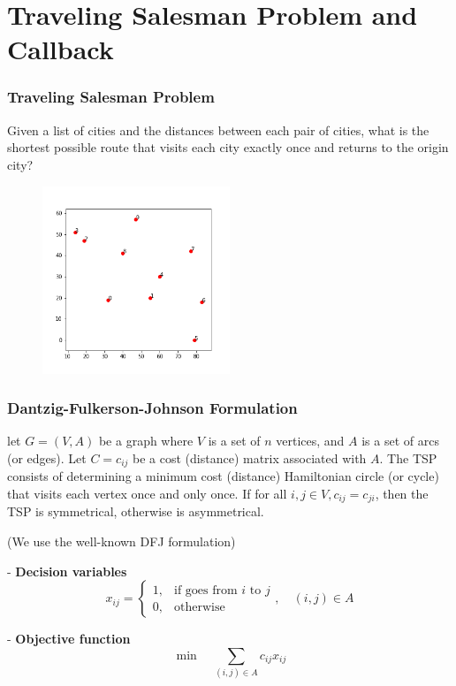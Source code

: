 \documentclass[10pt]{beamer}
\begin{document}
	\section{Traveling Salesman Problem and Callback}
		\begin{frame}
			\frametitle{Traveling Salesman Problem}
			Given a list of cities and the distances between each pair of cities, what is the shortest possible route that visits each city exactly once and returns to the origin city?
			\begin{figure}[!h]
				\centering
				\includegraphics[width=0.5\textwidth]{TSP}
			\end{figure}
		\end{frame}

		\begin{frame}
			\frametitle{Dantzig-Fulkerson-Johnson Formulation}
			let $G = (V, A)$ be a graph where $V$ is a set of $n$ vertices, and $A$ is a set of arcs (or edges). Let $C = c_{ij}$ be a cost (distance) matrix associated with $A$. The TSP consists of determining a minimum cost (distance) Hamiltonian circle (or cycle) that visits each vertex once and only once. If for all $i, j \in V, c_{ij} = c_{ji}$, then the TSP is symmetrical, otherwise is asymmetrical.

			(We use the well-known DFJ formulation)

			- \textbf{Decision variables}
			\begin{equation}
				x_{ij} = \begin{cases}
							1, &\text{if goes from } i \text{ to } j\\ 
							0, & \text{otherwise}
						\end{cases}, \quad (i, j) \in A
			\end{equation}

			- \textbf{Objective function}
				\begin{equation}
					\min \quad \sum_{(i, j)\in A} c_{ij}x_{ij}
				\end{equation}
		\end{frame}
\end{document}
